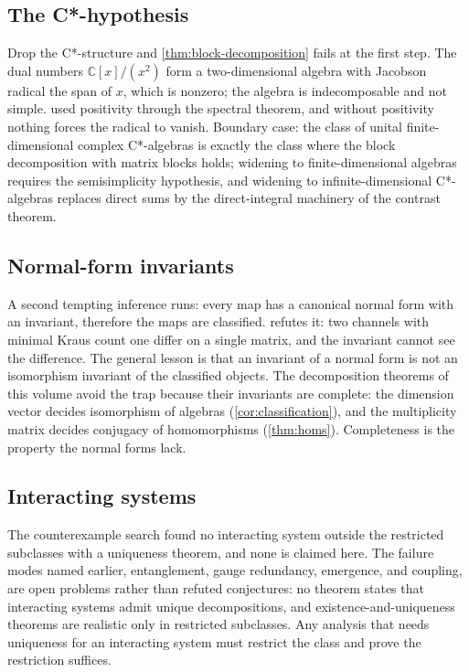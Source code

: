 \documentclass[11pt,letterpaper]{article}
\theoremstyle{definition}
\theoremstyle{remark}
\begin{document}
\subsection{The C*-hypothesis}

Drop the C*-structure and \cref{thm:block-decomposition} fails at the first step. The dual numbers $\mathbb{C}[x]/(x^2)$ form a two-dimensional algebra with Jacobson radical the span of $x$, which is nonzero; the algebra is indecomposable and not simple.  used positivity through the spectral theorem, and without positivity nothing forces the radical to vanish. Boundary case: the class of unital finite-dimensional complex C*-algebras is exactly the class where the block decomposition with matrix blocks holds; widening to finite-dimensional algebras requires the semisimplicity hypothesis, and widening to infinite-dimensional C*-algebras replaces direct sums by the direct-integral machinery of the contrast theorem.

\subsection{Normal-form invariants}

A second tempting inference runs: every map has a canonical normal form with an invariant, therefore the maps are classified.  refutes it: two channels with minimal Kraus count one differ on a single matrix, and the invariant cannot see the difference. The general lesson is that an invariant of a normal form is not an isomorphism invariant of the classified objects. The decomposition theorems of this volume avoid the trap because their invariants are complete: the dimension vector decides isomorphism of algebras (\cref{cor:classification}), and the multiplicity matrix decides conjugacy of homomorphisms (\cref{thm:homs}). Completeness is the property the normal forms lack.

\subsection{Interacting systems}

The counterexample search found no interacting system outside the restricted subclasses with a uniqueness theorem, and none is claimed here. The failure modes named earlier, entanglement, gauge redundancy, emergence, and coupling, are open problems rather than refuted conjectures: no theorem states that interacting systems admit unique decompositions, and existence-and-uniqueness theorems are realistic only in restricted subclasses. Any analysis that needs uniqueness for an interacting system must restrict the class and prove the restriction suffices.
\end{document}
